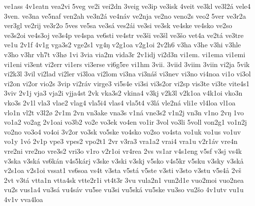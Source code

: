 {    ve1ass
    4v1eatn
    vea2vi
    5veg
    ve2i
    vei2dn
    3veig
    ve3ip
    ve3isk
    4veit
    ve3kl
    ve3l2á
    vele4
    3ven.
    ve3na
    ve5naf
    ven2ah
    ve3n2á
    ve4náv
    ve2nja
    ve2no
    veno2s
    veo2
    5ver
    ve3r2a
    ver3gl
    ve2rij
    ve3r2o
    5ves
    ve5sa
    ve3sá
    ves2ái
    ve3si
    ve3sk
    ve4ske
    ve4sko
    ve2so
    ve3s2oi
    ve4s3oj
    ve3s4p
    ve4spa
    ve6sti
    ve4str
    ve3ši
    ve3šl
    ve3šo
    vet4a
    ve2tá
    ve3tre
    ve1u
    2v1f
    4v1g
    vga3s2
    vge2s1
    vg4ŋ
    v2g1oa
    v2g1oi
    2v2h6
    v3ha
    v3he
    v3hi
    v3hle
    v3ho
    v3hr
    vh7t
    v3hø
    1vi
    3via
    via2m
    vida3r
    2v1idj
    vi2d3n
    vi1em.
    vi1ema
    vi1emi
    vi1eni
    vi3ent
    vi2err
    vi1ers
    vi3erse
    vi6g5re
    vi1hm
    3vii.
    3viid
    3viim
    3viin
    vi2ja
    5vik
    vi2k3l
    3vil
    vi2lad
    vi2ler
    vi3loa
    vi2lom
    vi3na
    vi3náš
    vi3nev
    vi3no
    vi4noa
    vi1o
    vi3ol
    vi2on
    vi2or
    vio2s
    3vip
    vi2ráv
    virge3
    vi5s4e
    vi3si
    vi3s2or
    vi2sp
    vis3te
    vi3te
    vite4s1
    3viv
    2v1j
    vja3
    vja2i
    vjja4st
    2vk
    vka3s2
    vkina4
    v3kj
    v2k3l
    v2k1oa
    v4k1oi
    vko3n
    vko3s
    2v1l
    vla3
    vlae2
    vlag4
    vla5i4
    vlas4
    vla5t4
    v3lá
    vle2ná
    vli1e
    vl4loa
    vl1oa
    vlo1n
    vl2t
    v3l2ø
    2v1m
    2vn
    vn3ake
    vna3s
    v1ná
    vne3s2
    v1n2j
    vn3n
    v1no
    2vŋ
    1vo
    vo1a2
    vo2ag
    2v1oai
    vo3b2
    vo2e
    vo3ek
    vo4en
    vo1ir
    3vol
    vo3li
    5voll
    von2g1
    vo1n2j
    vo2no
    vo3o4
    vo4oi
    3v2or
    vo3sk
    vo5ske
    vo4sko
    vo2so
    vo4sta
    vo1uk
    vo1us
    vo1uv
    vo1y
    1vó
    2v1p
    vpe3
    vpes2
    vpo2t1
    2vr
    v3ra3
    vra1a2
    vrai4
    vra1u
    v2r1áv
    vre4n
    vre2ni
    vre2no
    vre3s2
    vri3o
    v1ro
    v2r1oi
    vr4rea
    2vs
    vs1ar
    v4s1eng
    v5sf
    v3sj
    vs4k
    v3ska
    v3ská
    vs6kán
    v4s5kárj
    v3ske
    v3ski
    v3skj
    v5sko
    v4s5kr
    v5sku
    v3sky
    v3skå
    v2s1oa
    v2s1oi
    vssat1
    vs6soa
    vs4t
    v3sta
    v5stá
    v5ste
    v3sti
    v3sto
    v3stu
    v5s4å
    2vš
    2vt
    v3tá
    vtta1n
    vtta4sk
    vtte2r1i
    vt4t3r
    3vu
    vula2n1
    vun2d1e
    vuo2moi
    vuo2nea
    vu2s
    vus1a4
    vu3sá
    vu4sáv
    vu5se
    vu3si
    vu5ská
    vu5ske
    vu3so
    vu2šo
    4v1utv
    vu1u
    4v1v
    vva4loa
}
